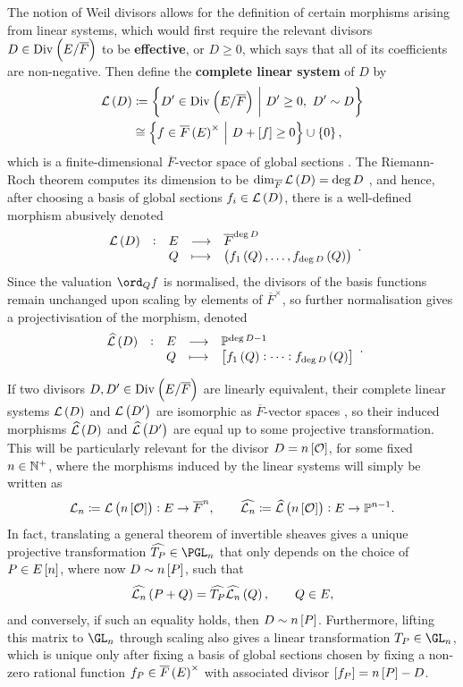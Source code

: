 The notion of Weil divisors allows for the definition of certain morphisms arising from linear systems, which would first require the relevant divisors $ D \in \Div $ to be \textbf{effective}, or $ D \ge 0 $, which says that all of its coefficients are non-negative. Then define the \textbf{complete linear system} of $ D $ by
\begin{align*}
\LLL\br{D}
& \coloneqq \cbr{D' \in \Div \st D' \ge 0, \ D' \sim D} \\
& \cong \cbr{f \in \overline{F}\br{E}^\times \st D + \sbr{f} \ge 0} \cup \cbr{0},
\end{align*}
which is a finite-dimensional $ \overline{F} $-vector space of global sections \cite[Proposition II.5.2(b)]{Sil09}. The Riemann-Roch theorem computes its dimension to be $ \dim_{\overline{F}} \LLL\br{D} = \deg D $ \cite[Proposition II.5.5(c)]{Sil09}, and hence, after choosing a basis of global sections $ f_i \in \LLL\br{D} $, there is a well-defined morphism abusively denoted
$$ \function[\LLL\br{D}]{E}{\overline{F}^{\deg D}}{Q}{\br{f_1\br{Q}, \dots, f_{\deg D}\br{Q}}}. $$
Since the valuation $ \ord_Q f $ is normalised, the divisors of the basis functions remain unchanged upon scaling by elements of $ \overline{F}^\times $, so further normalisation gives a projectivisation of the morphism, denoted
$$ \function[\widehat{\LLL}\br{D}]{E}{\PP^{\deg D - 1}}{Q}{\sbr{f_1\br{Q} : \dots : f_{\deg D}\br{Q}}}. $$

\pagebreak

\noindent
If two divisors $ D, D' \in \Div $ are linearly equivalent, their complete linear systems $ \LLL\br{D} $ and $ \LLL\br{D'} $ are isomorphic as $ \overline{F} $-vector spaces \cite[Proposition II.5.2(c)]{Sil09}, so their induced morphisms $ \widehat{\LLL}\br{D} $ and $ \widehat{\LLL}\br{D'} $ are equal up to some projective transformation. This will be particularly relevant for the divisor $ D = n\sbr{\OOO} $, for some fixed $ n \in \mathbb{N}^+ $, where the morphisms induced by the linear systems will simply be written as
$$ \LLL_n \coloneqq \LLL\br{n\sbr{\OOO}} : E \to \overline{F}^n, \qquad \widehat{\LLL_n} \coloneqq \widehat{\LLL}\br{n\sbr{\OOO}} : E \to \PP^{n - 1}. $$
In fact, translating a general theorem of invertible sheaves \cite[Theorem II.7.1]{Har77} gives a unique projective transformation $ \widehat{T_P} \in \PGL_n $ that only depends on the choice of $ P \in E\sbr{n} $, where now $ D \sim n\sbr{P} $, such that
$$ \widehat{\LLL_n}\br{P + Q} = \widehat{T_P}\widehat{\LLL_n}\br{Q}, \qquad Q \in E, $$
and conversely, if such an equality holds, then $ D \sim n\sbr{P} $. Furthermore, lifting this matrix to $ \GL_n $ through scaling also gives a linear transformation $ T_P \in \GL_n $, which is unique only after fixing a basis of global sections chosen by fixing a non-zero rational function $ f_P \in \overline{F}\br{E}^\times $ with associated divisor $ \sbr{f_P} = n\sbr{P} - D $.


